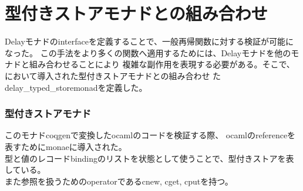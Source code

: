 \documentclass[japanese]{jssst_ppl}
\theoremstyle{definition}
\begin{document}
\iffalse
  \begin{verbatim}
  HB.mixin Record isMonadDelay (M : UU0 -> UU0) of Monad M := {
  while : forall {A B : UU0}, (A -> M(B + A)%type) -> A ->M B;
  wBisim: forall {A : UU0}, M A -> M A -> Prop;
  wBisim_refl: forall A (a: M A), wBisim a a;
  wBisim_sym: forall A (a b: M A), wBisim a b -> wBisim b a;
  wBisim_trans: forall A (a b c: M A), wBisim a b -> wBisim b c -> wBisim a c;
  fixpointE: forall (A B : UU0) (f: A -> M (B + A)%type) (a: A),
  wBisim (while f a) ((f a) >>= (sum_rect (fun => M B ) (@ret M B) (while f)));
  naturalityE: forall (A B C : UU0) (f: A -> M (B + A)%type) (g: B -> M C) (a: A),
  wBisim ((while f a) >>= g)(while (fun y => (f y) >>= (sum_rect (fun => M (C + A)%type) (M # inl \o g) (M # inr \o (@ret M A )) ) ) a);
  codiagonalE:forall (A B : UU0) (f: A -> M ((B + A) + A)%type) (a: A),
  wBisim (while ((M # ((sum_rect (fun => (B + A)%type) idfun inr)))  \o f ) a) (while (while f) a);
  bindmwB: forall (A B: UU0) (f: A -> M B)(d1 d2: M A),
  wBisim d1 d2 -> wBisim (d1 >>= f) (d2>>= f);
  bindfwB: forall (A B: UU0) (f g: A -> M B)(d: M A),
  (forall a, wBisim (f a) (g a)) -> wBisim (d >>= f) (d >>= g);
  whilewB: forall (A B : UU0) (f g: A -> M ((B + A))%type) (a: A),
  (forall a, wBisim (f a) (g a)) -> wBisim (while f a) (while g a);
  }.
        \end{verbatim}

\fi

\section{型付きストアモナドとの組み合わせ}

Delayモナドのinterfaceを定義することで、一般再帰関数に対する検証が可能になった。
この手法をより多くの関数へ適用するためには、Delayモナドを他のモナドと組み合わせることにより
複雑な副作用を表現する必要がある。そこで、\cite{practicalformalizationmonadicequational}において導入された型付きストアモナドとの組み合わせ
たdelay\_typed\_storemonadを定義した。


\subsubsection{型付きストアモナド}
このモナドcoqgenで変換したocamlのコードを検証する際、
ocamlのreferenceを表すためにmonaeに導入された。\\
型と値のレコードbindingのリストを状態として使うことで、型付きストアを表している。\\
また参照を扱うためのoperatorであるcnew, cget, cputを持つ。
\end{document}
